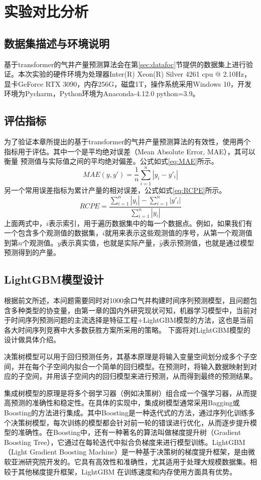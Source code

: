 \section{实验对比分析}
\subsection{数据集描述与环境说明}
基于transformer的气井产量预测算法会在第\ref{sec:datafoc}节提供的数据集上进行验证。本次实验的硬件环境为处理器Inter(R) Xeon(R) Silver 4261 cpu @ 2.10Hz，
显卡GeForce RTX 3090，内存256G，磁盘1T，操作系统采用Windows 10，开发环境为Pycharm，Python环境为Anaconda-4.12.0 python=3.9。
\subsection{评估指标}
为了验证本章所提出的基于transformer的气井产量预测算法的有效性，使用两个指标用于评估。其中一个是平均绝对误差（Mean Absolute Error, MAE），其可以衡量
预测值与实际值之间的平均绝对偏差。公式如式\eqref{eq:MAE}所示。
\begin{equation}
    MAE(y, y') = \frac{1}{n} \sum_{i=1}^{n} |y_i - y'_i|
    \label{eq:MAE}
\end{equation}
另一个常用误差指标为累计产量的相对误差，公式如式\eqref{eq:RCPE}所示。
\begin{equation}
    RCPE = \frac{\sum_{i=1}^{n} |y_i| - \sum_{i=1}^{n} |y'_i|}{\sum_{i=1}^{n} |y_i|}
    \label{eq:RCPE}
\end{equation}
上面两式中，$i$表示索引，用于遍历数据集中的每一个数据点。例如，如果我们有一个包含多个观测值的数据集，$i$就用来表示这些观测值的序号，从第一个观测值
到第$n$个观测值。$y$表示真实值，也就是实际产量，$\hat{y}$表示预测值，也就是通过模型预测得到的产量。
\subsection{LightGBM模型设计}
根据前文所述，本问题需要同时对1000余口气井构建时间序列预测模型，且问题包含多种类型的协变量，由第一章的国内外研究现状可知，机器学习模型中，当前对于时间序列预测问题的主流选择是特征工程+LightGBM模型的方法，这也是当前各大时间序列竞赛中大多数获胜方案所采用的策略。
下面将对LightGBM模型的设计做具体介绍。

决策树模型可以用于回归预测任务，其基本原理是将输入变量空间划分成多个子空间，并在每个子空间内拟合一个简单的回归模型。在预测时，将输入数据映射到对应的子空间，并用该子空间内的回归模型来进行预测，从而得到最终的预测结果。

集成树模型的原理是将多个弱学习器（例如决策树）组合成一个强学习器，从而提高预测的准确性和稳定性。在具体的实现中，集成树模型通常采用Bagging或Boosting的方法进行集成。其中Boosting是一种迭代式的方法，通过序列化训练多个决策树模型，每次训练的模型都会针对前一轮的错误进行优化，从而逐步提升模型的准确性。在Boosting中，还有一种著名的算法叫做梯度提升树（Gradient Boosting Tree），它通过在每轮迭代中拟合负梯度来进行模型训练。LightGBM（Light Gradient Boosting Machine）是一种基于决策树的梯度提升框架，是由微软亚洲研究院开发的。它具有高效性和准确性，尤其适用于处理大规模数据集。相较于其他梯度提升框架，LightGBM 在训练速度和内存使用方面具有优势。

